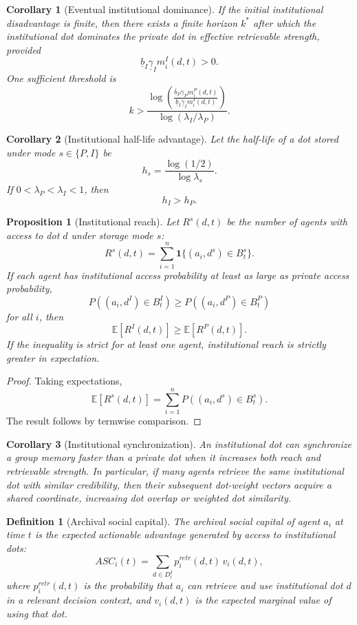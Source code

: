 \documentclass[11pt]{article}
\newtheorem{definition}{Definition}
\newtheorem{proposition}{Proposition}
\newtheorem{corollary}{Corollary}
\theoremstyle{remark}
\begin{document}
\begin{corollary}[Eventual institutional dominance]\label{cor:eventual-institutional-dominance}
If the initial institutional disadvantage is finite, then there exists a
finite horizon $k^*$ after which the institutional dot dominates the
private dot in effective retrievable strength, provided
$$
\underline b_I\underline\gamma_I m_i^I(d,t)>0.
$$
One sufficient threshold is
$$
k>
\frac{\log\left(\frac{\overline b_P\overline\gamma_P m_i^P(d,t)}
{\underline b_I\underline\gamma_I m_i^I(d,t)}\right)}
{\log(\lambda_I/\lambda_P)}.
$$
\end{corollary}


\begin{corollary}[Institutional half-life advantage]\label{cor:institutional-half-life}
Let the half-life of a dot stored under mode $s\in\{P,I\}$ be
$$
h_s=\frac{\log(1/2)}{\log \lambda_s}.
$$
If $0<\lambda_P<\lambda_I<1$, then
$$
h_I>h_P.
$$
\end{corollary}


\begin{proposition}[Institutional reach]\label{prop:institutional-reach}
Let $R^s(d,t)$ be the number of agents with access to dot $d$ under
storage mode $s$:
$$
R^s(d,t)=\sum_{i=1}^n \mathbf 1\{(a_i,d^s)\in B_t^s\}.
$$
If each agent has institutional access probability at least as large as
private access probability,
$$
P((a_i,d^I)\in B_t^I)\geq P((a_i,d^P)\in B_t^P)
$$
for all $i$, then
$$
\mathbb E[R^I(d,t)]\geq \mathbb E[R^P(d,t)].
$$
If the inequality is strict for at least one agent, institutional reach
is strictly greater in expectation.
\end{proposition}

\begin{proof}
Taking expectations,
$$
\mathbb E[R^s(d,t)]=\sum_{i=1}^n P((a_i,d^s)\in B_t^s).
$$
The result follows by termwise comparison.
\end{proof}

\begin{corollary}[Institutional synchronization]\label{cor:institutional-synchronization}
An institutional dot can synchronize a group memory faster than a
private dot when it increases both reach and retrievable strength. In
particular, if many agents retrieve the same institutional dot with
similar credibility, then their subsequent dot-weight vectors acquire a
shared coordinate, increasing dot overlap or weighted dot similarity.
\end{corollary}


\begin{definition}[Archival social capital]\label{def:archival-social-capital}
The archival social capital of agent $a_i$ at time $t$ is the expected
actionable advantage generated by access to institutional dots:
$$
ASC_i(t)=\sum_{d\in D_t^I} p_i^{retr}(d,t)\,v_i(d,t),
$$
where $p_i^{retr}(d,t)$ is the probability that $a_i$ can retrieve and
use institutional dot $d$ in a relevant decision context, and $v_i(d,t)$
is the expected marginal value of using that dot.
\end{definition}
\end{document}
